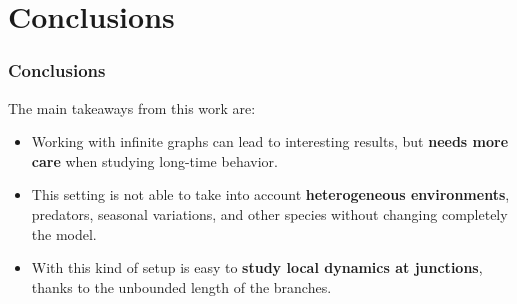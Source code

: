 \section{Conclusions}

\begin{frame}
    \frametitle{Conclusions}
    The main takeaways from this work are:
    \begin{itemize}
        \item Working with infinite graphs can lead to interesting results, but \textbf{needs more care} when studying long-time behavior.
        \item This setting is not able to take into account \textbf{heterogeneous environments}, predators, seasonal variations, and other species without changing completely the model.
        \item With this kind of setup is easy to \textbf{study local dynamics at junctions}, thanks to the unbounded length of the branches.
        
    \end{itemize}
\end{frame}